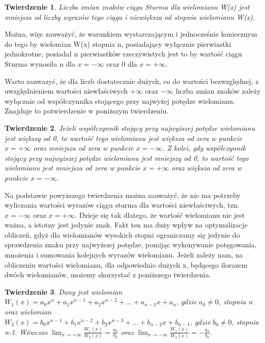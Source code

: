\documentclass[twoside,a4paper]{book}
\newtheorem{theorem}{Twierdzenie}
\begin{document}
\begin{theorem}
	Liczba zmian znaków ciągu Sturma dla wielomianu W(x) jest mniejsza od liczby wyrazów tego ciągu i niewiększa od stopnia wielomianu W(x).
\end{theorem}

Można, więc zauważyć, że warunkiem wystarczającym i jednocześnie koniecznym do tego by wielomian W(x) stopnia n, posiadający wyłącznie pierwiastki jednokrotne, posiadał n pierwiastków rzeczywistych jest to by wartość ciągu Sturma wynosiła n dla $x=-\infty$ oraz 0 dla $x=+\infty$. 

Warto zauwazyć, że dla liczb dostatecznie dużych, co do wartości bezwzględnej, z uwzględnieniem wartości niewłaściwych $+\infty$ oraz $-\infty$ liczba zmian znaków zależy wyłącznie od współczynnika stojącego przy najwyżej potędze wielomianu. Znajduje to potwierdzenie w poniższym twierdzeniu.

\begin{theorem}
	Jeżeli współczynnik stojący przy najwyższej potędze wielomianu jest większy od 0, to wartość tego wielomianu jest większa od zera w punkcie $x=+\infty$ oraz mniejsza od zera w punkcie $x=-\infty$.
	Z kolei, gdy współczynnik stojący przy najwyższej potędze wielomianu jest mniejszy od 0, to wartość tego wielomianu jest mniejsza od zera w punkcie $x=+\infty$ oraz większa od zera w punkcie $x=-\infty$.
\end{theorem}

Na podstawie powyższego twierdzenia można zauważyć, że nie ma potrzeby wyliczania wartości wyrazów ciągu sturma dla wartości niewłaściwych, tzn. $x=-\infty$ oraz $x=+\infty.$ Dzieje się tak dlatego, że wartość wielomianu nie jest ważna, a istotny jest jedynie znak. Fakt ten ma duży wpływ na optymalizacje obliczeń, gdyż dla wielomianów wysokich stopni ograniczamy się jedynie do sprawdzenia znaku przy najwyższej potędze, pomijąc wykonywanie potęgowania, mnożenia i sumowania kolejnych wyrazów wielomianu.
Jeżeli zależy nam, na obliczeniu wartości wielomianu, dla odpowiednio dużych x, będącego ilorazem dwóch wielomianów, możemy skorzystać z poniższego twierdzenia.

\begin{theorem}
	Dany jest wielomian $W_1(x) = a_0x^n + a_1x^{n-1} + a_2x^{n-2} + ... + a_{n-1}x + a_n,\ gdzie \ a_0 \ne 0$, stopnia n oraz wielomian $W_2(x) = b_0x^{n-1} + b_1x^{n-2} + b_2x^{n-3} + ... + b_{n-2}x + b_{n-1},\ gdzie\ b_0 \ne 0$, stopnia n-1. Wówczas $\lim_{x \to +\infty}\frac{W_1(x)}{W_2(x)} = \frac{a_0}{b_0}$ oraz $\lim_{x \to -\infty}\frac{W_1(x)}{W_2(x)} = -\frac{a_0}{b_0}.$
\end{theorem}
\end{document}
